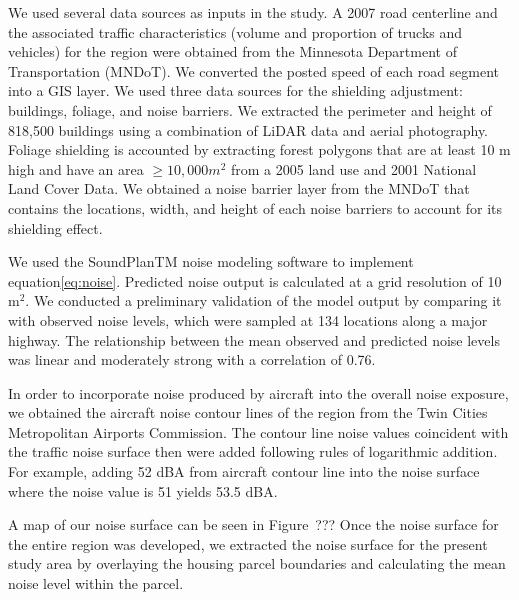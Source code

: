 \documentclass{article}\usepackage{graphicx, color}
\begin{document}
We used several data sources as inputs in the study.  A 2007 road centerline and the associated traffic characteristics (volume and proportion of trucks and vehicles) for the region were obtained from the Minnesota Department of Transportation (MNDoT).  We converted the posted speed of each road segment into a GIS layer.  We used three data sources for the shielding adjustment: buildings, foliage, and noise barriers.  We extracted the perimeter and height of 818,500 buildings using a combination of LiDAR data and aerial photography.  Foliage shielding is accounted by extracting forest polygons that are at least 10 m high and have an area $\geq 10,000 m^2$ from a 2005 land use and 2001 National Land Cover Data. We obtained a noise barrier layer from the MNDoT that contains the locations, width, and height of each noise barriers to account for its shielding effect. 

We used the SoundPlanTM noise modeling software to implement equation\ref{eq:noise}.  Predicted noise output is calculated at a grid resolution of 10 m$^2$.  We conducted a preliminary validation of the model output by comparing it with observed noise levels, which were sampled at 134 locations along a major highway. The relationship between the mean observed and predicted noise levels was linear and moderately strong with a correlation of 0.76.

In order to incorporate noise produced by aircraft into the overall noise exposure, we obtained the aircraft noise contour lines of the region from the Twin Cities Metropolitan Airports Commission. The contour line noise values coincident with the traffic noise surface then were added following rules of logarithmic addition. For example, adding 52 dBA from aircraft contour line into the noise surface where the noise value is 51 yields 53.5 dBA. 

A map of our noise surface can be seen in Figure~??? Once the noise surface for the entire region was developed, we extracted the noise surface for the present study area by overlaying the housing parcel boundaries and calculating the mean noise level within the parcel. 
\end{document}
